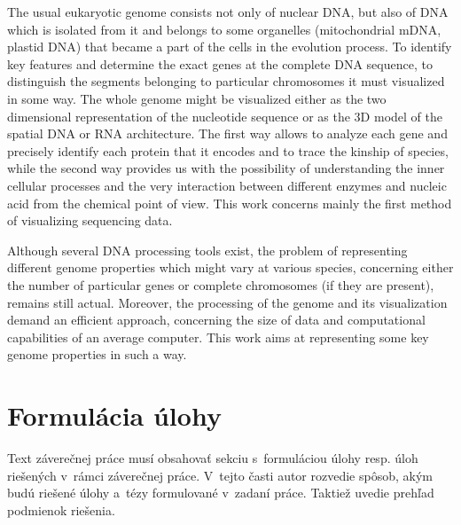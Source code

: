 The usual eukaryotic genome consists not only of nuclear DNA, but also of DNA which is isolated from it and belongs to some organelles (mitochondrial mDNA, plastid DNA) that became a part of the cells in the evolution process. To identify key features and determine the exact genes at the complete DNA sequence, to distinguish the segments belonging to particular chromosomes it must visualized in some way. The whole genome might be visualized either as the two dimensional representation of the nucleotide sequence or as the 3D model of the spatial DNA or RNA architecture. The first way allows to analyze each gene and precisely identify each protein that it encodes and to trace the kinship of species, while the second way provides us with the possibility of understanding the inner cellular processes and the very interaction between different enzymes and nucleic acid from the chemical point of view. This work concerns mainly the first method of visualizing sequencing data. 

Although several DNA processing tools exist, the problem of representing different genome properties which might vary at various species, concerning either the number of particular genes or complete chromosomes (if they are present), remains still actual. Moreover, the processing of the genome and its visualization demand an efficient approach, concerning the size of data and computational capabilities of an average computer. This work aims at representing some key genome properties in such a way.

\section*{Formulácia úlohy}

Text záverečnej práce musí obsahovať sekciu s~formuláciou úlohy resp. úloh riešených v~rámci záverečnej práce. V~tejto časti autor rozvedie spôsob, akým budú riešené úlohy a~tézy formulované v~zadaní práce. Taktiež uvedie prehľad podmienok riešenia.
